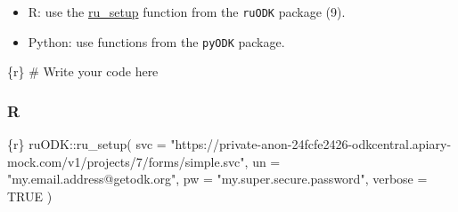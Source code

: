 \documentclass[
  letterpaper,
  DIV=11,
  numbers=noendperiod]{scrreprt}
\newenvironment{Shaded}{\begin{snugshade}}{\end{snugshade}}
\newcommand{\AttributeTok}[1]{\textcolor[rgb]{0.40,0.45,0.13}{#1}}
\newcommand{\CommentTok}[1]{\textcolor[rgb]{0.37,0.37,0.37}{#1}}
\newcommand{\ConstantTok}[1]{\textcolor[rgb]{0.56,0.35,0.01}{#1}}
\newcommand{\FunctionTok}[1]{\textcolor[rgb]{0.28,0.35,0.67}{#1}}
\newcommand{\InformationTok}[1]{\textcolor[rgb]{0.37,0.37,0.37}{#1}}
\newcommand{\NormalTok}[1]{\textcolor[rgb]{0.00,0.23,0.31}{#1}}
\newcommand{\SpecialCharTok}[1]{\textcolor[rgb]{0.37,0.37,0.37}{#1}}
\newcommand{\StringTok}[1]{\textcolor[rgb]{0.13,0.47,0.30}{#1}}
\providecommand{\tightlist}{%
  \setlength{\itemsep}{0pt}\setlength{\parskip}{0pt}}\usepackage{longtable,booktabs,array}
\begin{document}
\begin{tcolorbox}[enhanced jigsaw, colframe=quarto-callout-tip-color-frame, colback=white, rightrule=.15mm, bottomrule=.15mm, left=2mm, arc=.35mm, coltitle=black, title=\textcolor{quarto-callout-tip-color}{\faLightbulb}\hspace{0.5em}{Tip}, opacitybacktitle=0.6, bottomtitle=1mm, opacityback=0, toptitle=1mm, toprule=.15mm, colbacktitle=quarto-callout-tip-color!10!white, titlerule=0mm, leftrule=.75mm, breakable]

\begin{itemize}
\tightlist
\item
  R: use the
  \href{https://docs.ropensci.org/ruODK/reference/ru_setup.html}{ru\_setup}
  function from the \texttt{ruODK} package (9).
\item
  Python: use functions from the \texttt{pyODK} package.
\end{itemize}

\end{tcolorbox}

\begin{Shaded}
\begin{Highlighting}[]
\InformationTok{\textasciigrave{}\textasciigrave{}\textasciigrave{}\{r\}}
\CommentTok{\# Write your code here}
\InformationTok{\textasciigrave{}\textasciigrave{}\textasciigrave{}}
\end{Highlighting}
\end{Shaded}

\hypertarget{r-4}{%
\subsubsection{R}\label{r-4}}

\begin{Shaded}
\begin{Highlighting}[]
\InformationTok{\textasciigrave{}\textasciigrave{}\textasciigrave{}\{r\}}
\NormalTok{ruODK}\SpecialCharTok{::}\FunctionTok{ru\_setup}\NormalTok{(}
  \AttributeTok{svc =} \StringTok{"https://private{-}anon{-}24fcfe2426{-}odkcentral.apiary{-}mock.com/v1/projects/7/forms/simple.svc"}\NormalTok{,}
  \AttributeTok{un =} \StringTok{"my.email.address@getodk.org"}\NormalTok{,}
  \AttributeTok{pw =} \StringTok{"my.super.secure.password"}\NormalTok{,}
  \AttributeTok{verbose =} \ConstantTok{TRUE}
\NormalTok{)}
\InformationTok{\textasciigrave{}\textasciigrave{}\textasciigrave{}}
\end{Highlighting}
\end{Shaded}
\end{document}
